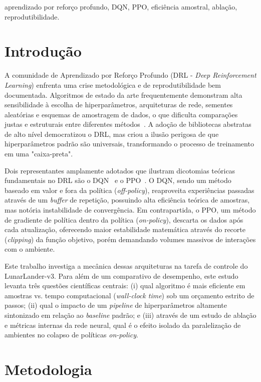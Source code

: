 \documentclass[conference]{IEEEtran}
\begin{document}
\begin{IEEEkeywords}
aprendizado por reforço profundo, DQN, PPO, eficiência amostral, ablação, reprodutibilidade.
\end{IEEEkeywords}

\section{Introdução}

A comunidade de Aprendizado por Reforço Profundo (DRL - \textit{Deep Reinforcement Learning}) enfrenta uma crise metodológica e de reprodutibilidade bem documentada. Algoritmos de estado da arte frequentemente demonstram alta sensibilidade à escolha de hiperparâmetros, arquiteturas de rede, sementes aleatórias e esquemas de amostragem de dados, o que dificulta comparações justas e estruturais entre diferentes métodos~\cite{henderson2018}. A adoção de bibliotecas abstratas de alto nível democratizou o DRL, mas criou a ilusão perigosa de que hiperparâmetros padrão são universais, transformando o processo de treinamento em uma "caixa-preta".

Dois representantes amplamente adotados que ilustram dicotomias teóricas fundamentais no DRL são o DQN~\cite{mnih2015} e o PPO~\cite{schulman2017}. O DQN, sendo um método baseado em valor e fora da política (\textit{off-policy}), reaproveita experiências passadas através de um \textit{buffer} de repetição, possuindo alta eficiência teórica de amostras, mas notória instabilidade de convergência. Em contrapartida, o PPO, um método de gradiente de política dentro da política (\textit{on-policy}), descarta os dados após cada atualização, oferecendo maior estabilidade matemática através do recorte (\textit{clipping}) da função objetivo, porém demandando volumes massivos de interações com o ambiente. 

Este trabalho investiga a mecânica dessas arquiteturas na tarefa de controle do LunarLander-v3. Para além de um comparativo de desempenho, este estudo levanta três questões científicas centrais: (i) qual algoritmo é mais eficiente em amostras vs. tempo computacional (\textit{wall-clock time}) sob um orçamento estrito de passos; (ii) qual o impacto de um \textit{pipeline} de hiperparâmetros altamente sintonizado em relação ao \textit{baseline} padrão; e (iii) através de um estudo de ablação e métricas internas da rede neural, qual é o efeito isolado da paralelização de ambientes no colapso de políticas \textit{on-policy}.

\section{Metodologia}
\end{document}
